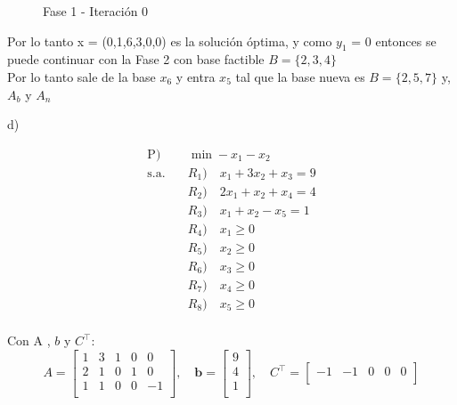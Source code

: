 \documentclass{article}
\begin{document}
\begin{flushleft}
		\begin{figure}[ht]
			\centering
			\caption{Fase 1 - Iteración 0}
			\label{fig:grafico}
		\end{figure}

		Por lo tanto x = (0,1,6,3,0,0) es la solución óptima, y como $y_1$ = 0 entonces se puede continuar con la Fase 2 con base factible $B = \{2,3,4\}$\\
		Por lo tanto sale de la base $x_6$ y entra $x_5$ tal que la base nueva es $B = \{2,5,7\}$ y, $A_b$ y $A_n$\\

		\vspace{0,5cm}

		
		d) \\
		\begin{center}
			\begin{align*}
				\text{P}) & \quad \min -x_1 - x_2 \\
				\text{s.a.} & \quad  R_1) \quad x_1 + 3x_2 + x_3 = 9 \\
						   & \quad R_2) \quad 2x_1 + x_2 + x_4 = 4 \\
						   & \quad R_3) \quad x_1 + x_2 - x_5 = 1 \\
						   & \quad R_4) \quad x_1\geq 0\\
						   & \quad R_5) \quad x_2 \geq 0 \\
						   & \quad R_6) \quad x_3 \geq 0 \\
						   & \quad R_7) \quad x_4 \geq 0 \\
						   & \quad R_8) \quad x_5 \geq 0 \\
			\end{align*}
		\end{center}

		Con A , $b$ y $C^\intercal$:
		\begin{equation*}
			A =
			\left[
			\begin{array}{ccccc}
			1 & 3 & 1 & 0 & 0 \\
			2 & 1 & 0 & 1 & 0 \\
			1 & 1 & 0 & 0 & -1  \\
			\end{array}
			\right], \quad
			\mathbf{b} =
			\left[
			\begin{array}{c}
			9 \\
			4 \\
			1 \\
			\end{array}
			\right], \quad
			C^\intercal =
			\left[
			\begin{array}{ccccc}
			-1 & -1 & 0 & 0 & 0\\
			\end{array}
			\right]
		\end{equation*}


\end{flushleft}
\end{document}
